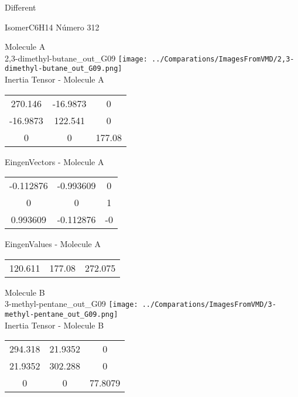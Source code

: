 \begin{center}
\vtab
\vtab
\textcolor{NavyBlue}{\Large Different}
\end{center}

 \newpage

\vtab[-2cm]
\begin{center}
{\large IsomerC6H14 \tab Número 312}
\end{center}
\begin{multicols}{2}
\begin{center}

Molecule A \\ 
2,3-dimethyl-butane\_out\_G09
\texttt{[image: ../Comparations/ImagesFromVMD/2,3-dimethyl-butane\_out\_G09.png]}
\\
Inertia Tensor - Molecule A \\
\vtab

\begin{tabular}{|c c c|}
270.146	 & 	-16.9873	 & 	0	 \\
-16.9873	 & 	122.541	 & 	0	 \\
0	 & 	0	 & 	177.08
\end{tabular}

\vtab
 EingenVectors - Molecule A     \\
\vtab
\begin{tabular}{|c c c|}
-0.112876	 & 	-0.993609	 & 	0	 \\
0	 & 	0	 & 	1	 \\
0.993609	 & 	-0.112876	 & 	-0
\end{tabular}

\vtab
 EingenValues - Molecule A     \\
\vtab
\begin{tabular}{|c c c|}
120.611	 & 	177.08	 & 	272.075	 \\
\end{tabular}
\columnbreak

Molecule B \\ 
3-methyl-pentane\_out\_G09
\texttt{[image: ../Comparations/ImagesFromVMD/3-methyl-pentane\_out\_G09.png]}
\\
Inertia Tensor - Molecule B \\
\vtab

\begin{tabular}{|c c c|}
294.318	 & 	21.9352	 & 	0	 \\
21.9352	 & 	302.288	 & 	0	 \\
0	 & 	0	 & 	77.8079
\end{tabular}


\end{center}
\end{multicols}
